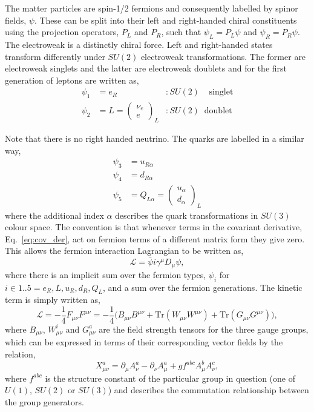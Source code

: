 The matter particles are spin-1/2 fermions and consequently labelled by spinor fields, $\psi$. These can be split into their left and right-handed chiral constituents using the projection operators, $P_{L}$ and $P_{R}$, such that $\psi_{L}=P_{L}\psi$ and $\psi_{R}=P_{R}\psi$.
The electroweak is a distinctly chiral force. Left and right-handed states transform differently under $SU(2)$ electroweak transformations. The former are electroweak singlets and the latter are electroweak doublets and for the first generation of leptons are written as,
\begin{align}
  \psi_{1} & = e_{R} &:SU(2)\;\;\;\;\mathrm{singlet} \\
  \psi_{2} & = L = \begin{pmatrix} \nu_{e} \\[-0.05cm] e \end{pmatrix}_{L} &:SU(2)\;\;\mathrm{doublet} 
\end{align}

Note that there is no right handed neutrino. The quarks are labelled in a similar way,
\begin{align}
  \psi_{3} & = u_{R\alpha} \\
  \psi_{4} & = d_{R\alpha} \\
  \psi_{5} & = Q_{L\alpha} = \begin{pmatrix} u_{\alpha} \\[-0.05cm] d_{\alpha} \end{pmatrix}_{L}  
\end{align}
where the additional index $\alpha$ describes the quark transformations in $SU(3)$ colour space. The convention is that whenever terms in the covariant derivative, Eq.~\ref{eq:cov_der}, act on fermion terms of a different matrix form they give zero. This allows the \SM fermion interaction Lagrangian to be written as,
\begin{equation}
  \mathcal{L} = \bar{\psi}i\gamma^{\mu}D_{\mu}\psi,
\end{equation}
where there is an implicit sum over the fermion types, $\psi_{i}$ for $i\in{1..5}=e_{R}, L, u_{R}, d_{R}, Q_{L}$, and a sum over the fermion generations. The kinetic term is simply written as,
\begin{equation}
  \mathcal{L} = -\frac{1}{4}F_{\mu\nu}F^{\mu\nu} = -\frac{1}{4}\biggl( B_{\mu\nu}B^{\mu\nu} + \mathrm{Tr} (W_{\mu\nu}W^{\mu\nu}) + \mathrm{Tr} (G_{\mu\nu}G^{\mu\nu}) \biggr),
\end{equation}
where $B_{\mu\nu}$, $W_{\mu\nu}^{i}$ and $G_{\mu\nu}^{a}$ are the field strength tensors for the three \SM gauge groups, which can be expressed in terms of their corresponding vector fields by the relation, 
\begin{equation}
X^{a}_{\mu\nu} = \partial_{\mu}A^{a}_{\nu}-\partial_{\nu}A^{a}_{\mu}+gf^{abc}A^{b}_{\mu}A^{c}_{\nu},
\end{equation}
where $f^{abc}$ is the structure constant of the particular group in question (one of $U(1)$, $SU(2)$ or $SU(3)$) and describes the commutation relationship between the group generators. %

